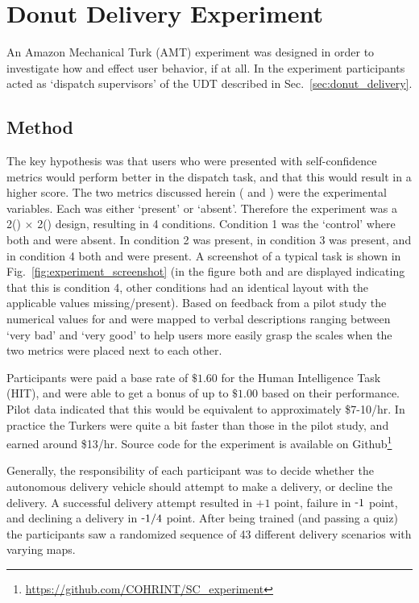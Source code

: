 \section{Donut Delivery Experiment} \label{sec:exp_results}
An Amazon Mechanical Turk (AMT) experiment was designed in order to investigate how \xQ{} and \xO{} effect user behavior, if at all. In the experiment participants acted as `dispatch supervisors' of the UDT described in Sec.~\ref{sec:donut_delivery}.

\subsection{Method}
The key hypothesis was that users who were presented with self-confidence metrics would perform better in the dispatch task, and that this would result in a higher score.
The two \famsec{} metrics discussed herein (\xQ{} and \xO) were the experimental variables. Each was either `present' or `absent'. Therefore the experiment was a 2(\xQ) $\times$ 2(\xO) design, resulting in 4 conditions. Condition 1 was the `control' where both \xQ{} and \xO{} were absent. In condition 2 \xQ{} was present, in condition 3 \xO{} was present, and in condition 4 both \xQ{} and \xO{} were present. A screenshot of a typical task is shown in Fig.~\ref{fig:experiment_screenshot} (in the figure both \xQ{} and \xO{} are displayed indicating that this is condition 4, other conditions had an identical layout with the applicable values missing/present). Based on feedback from a pilot study the numerical values for \xQ{} and \xO{} were mapped to verbal descriptions ranging between `very bad' and `very good' to help users more easily grasp the scales when the two metrics were placed next to each other.

Participants were paid a base rate of $\$1.60$ for the Human Intelligence Task (HIT), and were able to get a bonus of up to $\$1.00$ based on their performance. Pilot data indicated that this would be equivalent to approximately \$7-10/hr. In practice the Turkers were quite a bit faster than those in the pilot study, and earned around \$13/hr. Source code for the experiment is available on Github\footnote{\url{https://github.com/COHRINT/SC_experiment}}

Generally, the responsibility of each participant was to decide whether the autonomous delivery vehicle should attempt to make a delivery, or decline the delivery. A successful delivery attempt resulted in $+1$ point, failure in $\-1$ point, and declining a delivery in $\-1/4$ point. After being trained (and passing a quiz) the participants saw a randomized sequence of 43 different delivery scenarios with varying maps. 

